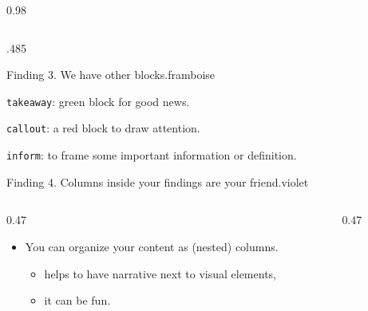 \documentclass[final,svgnames,english]{beamer}
\begin{document}
\begin{frame}[fragile]{}
\begin{columns}[T]
\begin{column}{0.98\linewidth}
\begin{columns}[T]
\begin{column}{.485\linewidth}
\begin{plainblock}{}
            \begin{findingblock}{Finding 3. We have other blocks.}{framboise}
              \begin{takeaway}
                \texttt{takeaway}: green block for good news. \lipsum[1][1-2]
              \end{takeaway}

              \begin{callout}
                \texttt{callout}: a red block to draw attention. \lipsum[1][1-2]
              \end{callout}

              \begin{inform}
                \texttt{inform}: to frame some important information or definition. \lipsum[1][1-2]
              \end{inform}
            \end{findingblock}

            \begin{findingblock}{Finding 4. Columns inside your findings are your friend.}{violet}
              \begin{columns}[T]
                \begin{column}{0.47\textwidth}
                  \begin{itemize}
                    \item You can organize your content as (nested) columns.
                      \begin{itemize}
                        \item helps to have narrative next to visual elements,
                        \item it can be fun.
                      \end{itemize}
                  \end{itemize}
                \end{column}
                \begin{column}{0.47\textwidth}
                  \centering
                  
                \end{column}
              \end{columns}
            \end{findingblock}
          \end{plainblock}


\end{column}
\end{columns}
\end{column}
\end{columns}
\end{frame}
\end{document}
